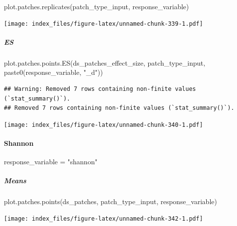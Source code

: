 \documentclass[
]{article}
\newenvironment{Shaded}{\begin{snugshade}}{\end{snugshade}}
\newcommand{\FunctionTok}[1]{\textcolor[rgb]{0.00,0.00,0.00}{#1}}
\newcommand{\NormalTok}[1]{#1}
\newcommand{\OtherTok}[1]{\textcolor[rgb]{0.56,0.35,0.01}{#1}}
\newcommand{\StringTok}[1]{\textcolor[rgb]{0.31,0.60,0.02}{#1}}
\begin{document}
\begin{Shaded}
\begin{Highlighting}[]
\FunctionTok{plot.patches.replicates}\NormalTok{(patch\_type\_input,}
\NormalTok{                        response\_variable)}
\end{Highlighting}
\end{Shaded}

\texttt{[image: index\_files/figure-latex/unnamed-chunk-339-1.pdf]}

\hypertarget{es-9}{%
\subparagraph{ES}\label{es-9}}

\begin{Shaded}
\begin{Highlighting}[]
\FunctionTok{plot.patches.points.ES}\NormalTok{(ds\_patches\_effect\_size, patch\_type\_input,}
                       \FunctionTok{paste0}\NormalTok{(response\_variable, }\StringTok{"\_d"}\NormalTok{))}
\end{Highlighting}
\end{Shaded}

\begin{verbatim}
## Warning: Removed 7 rows containing non-finite values (`stat_summary()`).
## Removed 7 rows containing non-finite values (`stat_summary()`).
\end{verbatim}

\texttt{[image: index\_files/figure-latex/unnamed-chunk-340-1.pdf]}

\hypertarget{shannon-4}{%
\paragraph{Shannon}\label{shannon-4}}

\begin{Shaded}
\begin{Highlighting}[]
\NormalTok{response\_variable }\OtherTok{=} \StringTok{"shannon"}
\end{Highlighting}
\end{Shaded}

\hypertarget{means-28}{%
\subparagraph{Means}\label{means-28}}

\begin{Shaded}
\begin{Highlighting}[]
\FunctionTok{plot.patches.points}\NormalTok{(ds\_patches, patch\_type\_input,}
\NormalTok{                       response\_variable)}
\end{Highlighting}
\end{Shaded}

\texttt{[image: index\_files/figure-latex/unnamed-chunk-342-1.pdf]}
\end{document}
